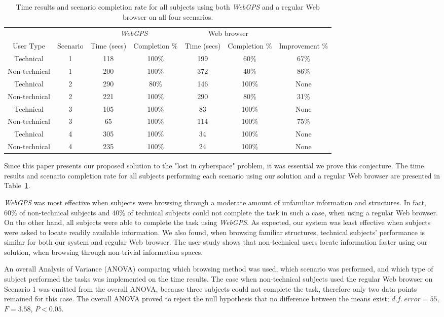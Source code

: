 \documentclass[10pt,psfig]{article}
\begin{document}
{\begin{table}[t]
\begin{center}
\begin{tabular}{|c|c|c|c|c|c|c|}
& &\multicolumn{2}{|c|}{{\em WebGPS}}&\multicolumn{2}{|c|}{Web browser} & \\\cline{3-6}
User Type&Scenario&Time (secs)&Completion \%&Time (secs)&Completion \%&Improvement \%\\\hline

Technical&1&118&100\%&199&60\%&67\%\\\hline
Non-technical&1&200&100\%&372&40\%&86\%\\\hline
Technical&2&290&80\%&146&100\%&None\\\hline
Non-technical&2&221&100\%&290&80\%&31\%\\\hline
Technical&3&105&100\%&83&100\%&None\\\hline
Non-technical&3&65&100\%&114&100\%&75\%\\\hline
Technical&4&305&100\%&34&100\%&None\\\hline
Non-technical&4&235&100\%&24&100\%&None\\\hline

\end{tabular}
\end{center}
\caption{Time results and scenario completion rate for all subjects using both {\em WebGPS} and a regular Web browser on all four scenarios.}
\label{table:time}
\end{table}

Since this paper presents our proposed solution to the "lost in cyberspace" problem, it was essential we prove this conjecture.
The time results and scenario completion rate for all subjects performing each scenario using our solution and a regular Web browser are presented in Table~\ref{table:time}.

{\em WebGPS} was most effective when subjects were browsing through a moderate amount of unfamiliar information and structures.
In fact, 60\% of non-technical subjects and 40\% of technical subjects could not complete the task in such a case, when using a regular Web browser.
On the other hand, all subjects were able to complete the task using {\em WebGPS}.
As expected, our system was least effective when subjects were asked to locate readily available information.
We also found, when browsing familiar structures, technical subjects' performance is similar for both our system and regular Web browser.
The user study shows that non-technical users locate information faster using our solution, when browsing through non-trivial information spaces.



An overall Analysis of Variance (ANOVA) comparing which browsing method was used, which scenario was performed, and which type of subject performed the tasks was implemented on the time results.
The case when non-technical subjects used the regular Web browser on Scenario 1 was omitted from the overall ANOVA, because three subjects could not complete the task, therefore only two data points remained for this case.
The overall ANOVA proved to reject the null hypothesis that no difference between the means exist; $d.f.\ error=55$, $F=3.58$, $P<0.05$.

}
\end{document}
